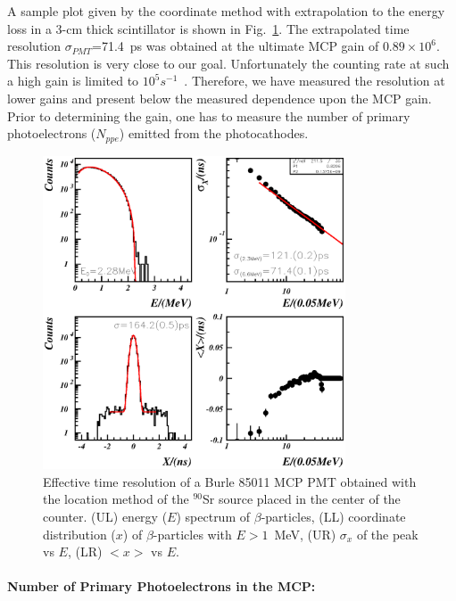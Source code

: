 A sample plot given by the coordinate method with extrapolation to the 
energy loss in a 3-cm thick scintillator is shown in Fig.~\ref{mcp85011sample}.
The extrapolated time resolution $\sigma_{PMT}$=71.4~ps was obtained at the 
ultimate MCP gain of $0.89\times10^6$.  This resolution is very close to our 
goal.  Unfortunately the counting rate at such a high gain is limited to 
$10^5s^{-1}$~\cite{Baturin:2005}.  Therefore, we have measured the resolution 
at lower gains and present below the measured dependence upon the MCP gain.  
Prior to determining the gain, one has to measure the number of primary 
photoelectrons ($N_{ppe}$) emitted from the photocathodes. 

\begin{figure}[htbp]
\centering
\includegraphics[width=0.8\textwidth]{esxm_picture13.ps}
\caption{\small{Effective time resolution of a Burle 85011 MCP PMT obtained 
with the location method of the $^{90}$Sr source placed in the center of the 
counter.  (UL) energy ($E$) spectrum of $\beta$-particles, (LL) coordinate 
distribution ($x$) of $\beta$-particles with $E>1$~MeV, (UR) $\sigma_x$ of 
the peak vs $E$, (LR) $<x>$ vs  $E$.}}
\label{mcp85011sample}
\end{figure}

\paragraph*{Number of Primary Photoelectrons in the MCP:}


